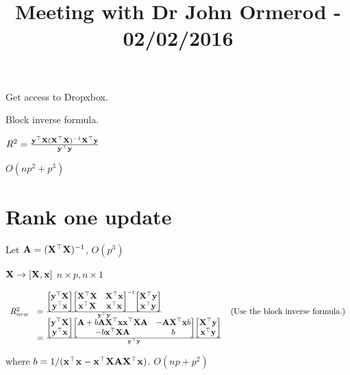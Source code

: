 \documentclass{amsart}
\title{Meeting with Dr John Ormerod - 02/02/2016}
\begin{document}
\maketitle

Get access to Dropxbox.

Block inverse formula.

$R^2 = \frac{{\bf y}^\top {\bf X} ({\bf X}^\top {\bf X})^{-1} {\bf X}^\top {\bf y}}{{\bf y}^\top {\bf y}}$

$O(np^2 + p^3)$

\section{Rank one update}

Let ${\bf A} = ({\bf X}^\top {\bf X})^{-1}$, $O(p^3)$

${\bf X} \to [{\bf X}, {\bf x}]$
$n \times p, n \times 1$

\begin{equation*}
\begin{array}{lll}
R^2_{new} &= \frac{
\begin{bmatrix}
{\bf y}^\top {\bf X} \\
{\bf y}^\top {\bf x}
\end{bmatrix}
\begin{bmatrix}
{\bf X}^\top {\bf X} & {\bf X}^\top {\bf x} \\
{\bf x}^\top {\bf X} & {\bf x}^\top {\bf x}
\end{bmatrix}^{-1}
\begin{bmatrix}
{\bf X}^\top {\bf y} \\
{\bf x}^\top {\bf y}
\end{bmatrix}
}{{\bf y}^\top {\bf y}} & \text{(Use the block inverse formula.)} \\
&= \frac{
\begin{bmatrix}
{\bf y}^\top {\bf X} \\
{\bf y}^\top {\bf x}
\end{bmatrix}
\begin{bmatrix}
{\bf A} + b {\bf A} {\bf X}^\top {\bf x} {\bf x}^\top {\bf X} {\bf A} & -{\bf A} {\bf X}^\top {\bf x} b \\
-b {\bf x}^\top {\bf X} {\bf A} & b
\end{bmatrix}
\begin{bmatrix}
{\bf X}^\top {\bf y} \\
{\bf x}^\top {\bf y}
\end{bmatrix}
}{{\bf y}^\top {\bf y}}
\end{array}
\end{equation*}

where $b = 1/({\bf x}^\top {\bf x} - {\bf x}^\top {\bf X} {\bf A} {\bf X}^\top {\bf x})$. $O(np + p^2)$
\end{document}
